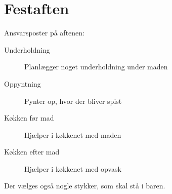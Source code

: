\section{Festaften}
Ansvarsposter på aftenen:
\begin{description}
\item[Underholdning] Planlægger noget underholdning under maden
\item[Oppyntning] Pynter op, hvor der bliver spist
\item[Køkken før mad] Hjælper i køkkenet med maden
\item[Køkken efter mad] Hjælper i køkkenet med opvask
\end{description}

Der vælges også nogle stykker, som skal stå i baren.